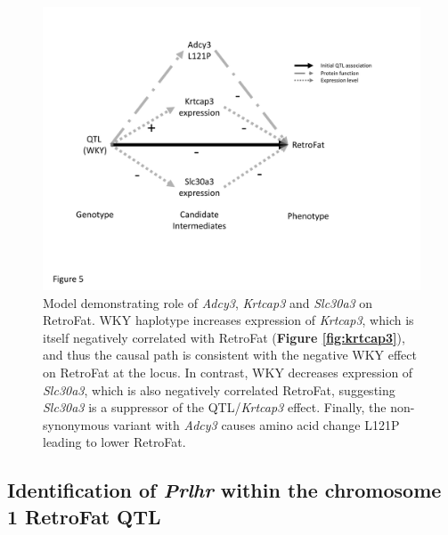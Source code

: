 \begin{figure}
\centering
\includegraphics[trim={0in 1.5in 0in 0.5in}, clip, width=\textwidth]{figures/5-hsrats/Figure5.pdf}
\caption[Causal graph model for the candidates underlying the RetroFat chromosome 6 QTL]{Model demonstrating role of \textit{Adcy3}, \textit{Krtcap3} and \textit{Slc30a3} on RetroFat. WKY haplotype increases expression of \textit{Krtcap3}, which is itself negatively correlated with RetroFat (\textbf{Figure \ref{fig:krtcap3}}), and thus the causal path is consistent with the negative WKY effect on RetroFat at the locus.  In contrast, WKY decreases expression of \textit{Slc30a3}, which is also negatively correlated RetroFat, suggesting \textit{Slc30a3} is a suppressor of the QTL/\textit{Krtcap3} effect.  Finally, the non-synonymous variant with \textit{Adcy3} causes amino acid change L121P leading to lower RetroFat. \label{fig:mediation_graph}}
\end{figure}

\subsection{Identification of \textit{Prlhr} within the chromosome 1 RetroFat QTL}

